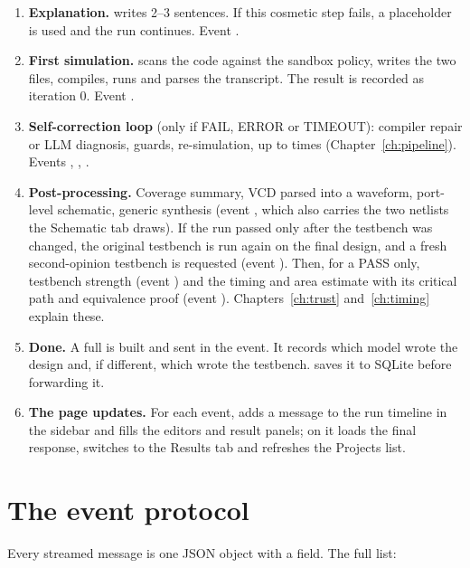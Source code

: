 \begin{enumerate}[leftmargin=*,label=\textbf{Step \arabic*.}]
  \item \textbf{Explanation.}  writes 2--3 sentences. If this cosmetic step fails, a placeholder is used and the run continues. Event .
  \item \textbf{First simulation.}  scans the code against the sandbox policy, writes the two files, compiles, runs and parses the transcript. The result is recorded as iteration 0. Event .
  \item \textbf{Self-correction loop} (only if FAIL, ERROR or TIMEOUT): compiler repair or LLM diagnosis, guards, re-simulation, up to  times (Chapter~\ref{ch:pipeline}). Events , , .
  \item \textbf{Post-processing.} Coverage summary, VCD parsed into a waveform, port-level schematic, generic synthesis (event , which also carries the two netlists the Schematic tab draws). If the run passed only after the testbench was changed, the original testbench is run again on the final design, and a fresh second-opinion testbench is requested (event ). Then, for a PASS only, testbench strength (event ) and the timing and area estimate with its critical path and equivalence proof (event ). Chapters~\ref{ch:trust} and~\ref{ch:timing} explain these.
  \item \textbf{Done.} A full  is built and sent in the  event. It records which model wrote the design and, if different, which wrote the testbench.  saves it to SQLite before forwarding it.
  \item \textbf{The page updates.} For each event,  adds a message to the run timeline in the sidebar and fills the editors and result panels; on  it loads the final response, switches to the Results tab and refreshes the Projects list.
\end{enumerate}

\section{The event protocol}

Every streamed message is one JSON object with a  field. The full list:

